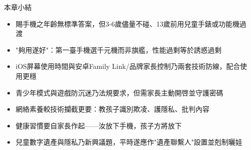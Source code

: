 \begin{tcbsummary}{本章小結}
\begin{itemize}
  \item 賜手機之年齡無標準答案，但3-6歲儘量不碰、13歲前用兒童手錶或功能機過渡
  \item "夠用遂好"：第一臺手機選千元機而非旗艦，性能過剩等於誘惑過剩
  \item iOS屏幕使用時間與安卓Family Link/品牌家長控制乃兩套技術防線，配合使用更穩
  \item 青少年模式與遊戲防沉迷乃法規要求，但需家長主動開啓並守護密碼
  \item 網絡素養較技術攔截更要：教孩子識別欺凌、護隱私、批判內容
  \item 健康習慣要自家長作起——汝放下手機，孩子方將放下
  \item 兒童數字遺產與隱私乃新興議題，平時遂應作"遺產聯繫人"設置並剋制曬娃
\end{itemize}

\end{tcbsummary}
